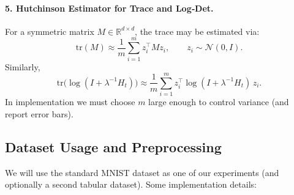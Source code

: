 \paragraph{5. Hutchinson Estimator for Trace and Log‐Det.}  
For a symmetric matrix \(M\in\mathbb R^{d\times d}\), the trace may be estimated via:
\[
\mathrm{tr}(M) \approx \frac1m\sum_{i=1}^m z_i^\top M z_i,\qquad z_i\sim\mathcal N(0,I).
\]
Similarly,
\[
\mathrm{tr}\big(\log(I+\lambda^{-1}H_t)\big) \approx \frac1m \sum_{i=1}^m z_i^\top \log(I+\lambda^{-1}H_t)\,z_i.
\]
In implementation we must choose \(m\) large enough to control variance (and report error bars).

\subsection{Dataset Usage and Preprocessing}

We will use the standard MNIST dataset as one of our experiments (and optionally a second tabular dataset). Some implementation details:

